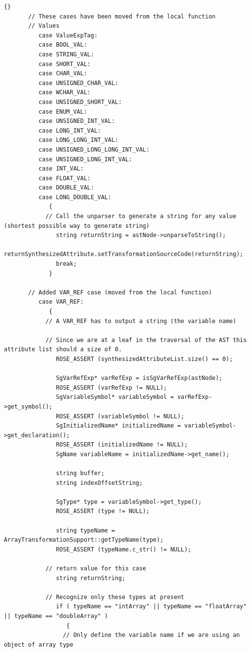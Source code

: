 \documentclass[10pt]{article}
\begin{document}
{\begin{lstlisting}{}
       // These cases have been moved from the local function
       // Values
          case ValueExpTag:
          case BOOL_VAL:
          case STRING_VAL:
          case SHORT_VAL:
          case CHAR_VAL:
          case UNSIGNED_CHAR_VAL:
          case WCHAR_VAL:
          case UNSIGNED_SHORT_VAL:
          case ENUM_VAL:
          case UNSIGNED_INT_VAL:
          case LONG_INT_VAL:
          case LONG_LONG_INT_VAL:
          case UNSIGNED_LONG_LONG_INT_VAL:
          case UNSIGNED_LONG_INT_VAL:
          case INT_VAL:
          case FLOAT_VAL:
          case DOUBLE_VAL:
          case LONG_DOUBLE_VAL:
             {
            // Call the unparser to generate a string for any value (shortest possible way to generate string)
               string returnString = astNode->unparseToString();
               returnSynthesizedAttribute.setTransformationSourceCode(returnString);
               break;
             }

       // Added VAR_REF case (moved from the local function)
          case VAR_REF:
             {
            // A VAR_REF has to output a string (the variable name)

            // Since we are at a leaf in the traversal of the AST this attribute list should a size of 0.
               ROSE_ASSERT (synthesizedAttributeList.size() == 0);

               SgVarRefExp* varRefExp = isSgVarRefExp(astNode);
               ROSE_ASSERT (varRefExp != NULL);
               SgVariableSymbol* variableSymbol = varRefExp->get_symbol();
               ROSE_ASSERT (variableSymbol != NULL);
               SgInitializedName* initializedName = variableSymbol->get_declaration();
               ROSE_ASSERT (initializedName != NULL);
               SgName variableName = initializedName->get_name();

               string buffer;
               string indexOffsetString;

               SgType* type = variableSymbol->get_type();
               ROSE_ASSERT (type != NULL);

               string typeName = ArrayTransformationSupport::getTypeName(type);
               ROSE_ASSERT (typeName.c_str() != NULL);

            // return value for this case
               string returnString;

            // Recognize only these types at present
               if ( typeName == "intArray" || typeName == "floatArray" || typeName == "doubleArray" )
                  {
                 // Only define the variable name if we are using an object of array type


\end{lstlisting}}
\end{document}
